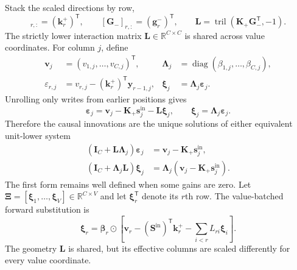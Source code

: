 \documentclass[11pt]{article}
\newcommand{\R}{\mathbb{R}}
\newcommand{\ve}[1]{\boldsymbol{#1}}
\newcommand{\tr}{\mathsf{T}}
\newcommand{\diag}{\operatorname{diag}}
\begin{document}
Stack the scaled directions by row,
\begin{equation}
  [\ve{K}_{+}]_{r,:}=(\ve{k}^{+}_r)^{\tr},
  \qquad
  [\ve{G}_{-}]_{r,:}=(\ve{g}^{-}_r)^{\tr},
  \qquad
  \ve{L}
  =\operatorname{tril}(\ve{K}_{+}\ve{G}_{-}^{\tr},-1).
  \label{eq:kdn2-chunk-shared-interaction}
\end{equation}
The strictly lower interaction matrix $\ve{L}\in\R^{C\times C}$ is shared across value
coordinates.  For column $j$, define
\begin{equation}
\begin{aligned}
  \ve{v}_j
  &=(v_{1,j},\ldots,v_{C,j})^{\tr},
  &
  \ve{\Lambda}_j
  &=\diag(\beta_{1,j},\ldots,\beta_{C,j}),
  \\
  \varepsilon_{r,j}
  &=v_{r,j}-(\ve{k}^{+}_r)^{\tr}\ve{y}_{r-1,j},
  &
  \ve{\xi}_j
  &=\ve{\Lambda}_j\ve{\varepsilon}_j.
\end{aligned}
  \label{eq:kdn2-chunk-innovation-variables}
\end{equation}
Unrolling only writes from earlier positions gives
\begin{equation}
  \ve{\varepsilon}_j
  =\ve{v}_j-\ve{K}_{+}\ve{s}^{\mathrm{in}}_j-\ve{L}\ve{\xi}_j,
  \qquad
  \ve{\xi}_j=\ve{\Lambda}_j\ve{\varepsilon}_j.
  \label{eq:kdn2-chunk-causal-unrolling}
\end{equation}
Therefore the causal innovations are the unique solutions of either equivalent unit-lower system
\begin{equation}
\begin{aligned}
  (\ve{I}_C+\ve{L}\ve{\Lambda}_j)\ve{\varepsilon}_j
  &=\ve{v}_j-\ve{K}_{+}\ve{s}^{\mathrm{in}}_j,
  \\
  (\ve{I}_C+\ve{\Lambda}_j\ve{L})\ve{\xi}_j
  &=\ve{\Lambda}_j
    (\ve{v}_j-\ve{K}_{+}\ve{s}^{\mathrm{in}}_j).
\end{aligned}
  \label{eq:kdn2-chunk-triangular-systems}
\end{equation}
The first form remains well defined when some gains are zero.  Let
$\ve{\Xi}=[\ve{\xi}_1,\ldots,\ve{\xi}_V]\in\R^{C\times V}$ and let
$\ve{\xi}_r^{\tr}$ denote its $r$th row.  The value-batched forward substitution is
\begin{equation}
  \ve{\xi}_r
  =\ve{\beta}_r\odot
   \left[
     \ve{v}_r
     -(\ve{S}^{\mathrm{in}})^{\tr}\ve{k}^{+}_r
     -\sum_{i<r}L_{ri}\ve{\xi}_i
   \right].
  \label{eq:kdn2-chunk-fused-substitution}
\end{equation}
The geometry $\ve{L}$ is shared, but its effective columns are scaled differently for every value
coordinate.
\end{document}
